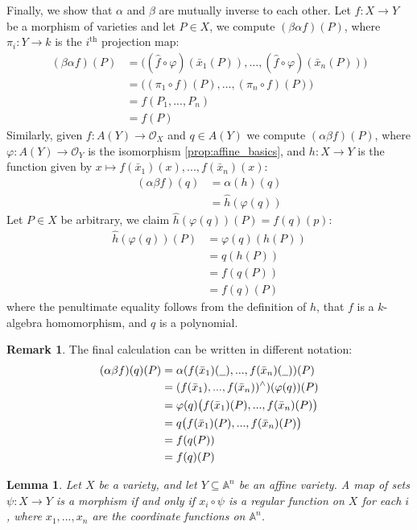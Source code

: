 \documentclass[12pt]{article}
\theoremstyle{plain}
\newtheorem{lemma}[thm]{Lemma}
\theoremstyle{definition}
\newtheorem{remark}[thm]{Remark}
\newcommand{\bb}[1]{\mathbb{#1}}
\newcommand{\call}[1]{\mathcal{#1}}
\newcommand{\und}[1]{\underline{\hspace{#1 cm}}}
\newcommand{\lto}{\longrightarrow}
\begin{document}
Finally, we show that $\alpha$ and $\beta$ are mutually inverse to each other. Let $f: X \lto Y$ be a morphism of varieties and let $P \in X$, we compute $(\beta \alpha f)(P)$, where $\pi_i: Y \lto k$ is the $i^{\text{th}}$ projection map:
\begin{align*}
    (\beta \alpha f)(P) &= \big((\hat{f} \circ \varphi)(\bar{x}_1(P)),\hdots,(\hat{f}\circ \varphi)(\bar{x}_n(P))\big)\\
    &= \big((\pi_1 \circ f)(P),\hdots,(\pi_n \circ f)(P)\big)\\
    &= f(P_1,...,P_n)\\
    &= f(P)
\end{align*}
Similarly, given $f: A(Y) \lto \call{O}_X$ and $q \in A(Y)$ we compute $(\alpha \beta f)(P)$, where $\varphi: A(Y) \lto \call{O}_Y$ is the isomorphism \eqref{prop:affine_basics}, and $h: X \lto Y$ is the function given by $x \mapsto f(\bar{x}_1)(x),...,f(\bar{x}_n)(x)$:
\begin{align*}
    (\alpha \beta f)(q) &= \alpha(h)(q)\\
    &= \hat{h}(\varphi(q))
\end{align*}
Let $P \in X$ be arbitrary, we claim $\hat{h}(\varphi(q))(P) = f(q)(p)$:
\begin{align*}
    \hat{h}(\varphi(q))(P) &= \varphi(q)(h(P))\\
    &= q(h(P))\\
    &= f(q(P))\\
    &= f(q)(P)
\end{align*}
where the penultimate equality follows from the definition of $h$, that $f$ is a $k$-algebra homomorphism, and $q$ is a polynomial.
\begin{remark}
The final calculation can be written in different notation:
\begin{align*}
    (\alpha\beta f)(q)(P) &= \alpha(f(\bar{x}_1)(\und{0.2}),...,f(\bar{x}_n)(\und{0.2}))(P)\\
    &= (f(\bar{x}_1),...,f(\bar{x}_n))^{\wedge{ }})(\varphi(q))(P)\\
    &= \varphi(q)\big(f(\bar{x}_1)(P),...,f(\bar{x}_n)(P)\big)\\
    &= q\big(f(\bar{x}_1)(P),...,f(\bar{x}_n)(P)\big)\\
    &= f(q(P))\\
    &= f(q)(P)
\end{align*}
\end{remark}
\begin{lemma}\label{lem:check_variables}
Let $X$ be a variety, and let $Y \subseteq \bb{A}^n$ be an affine variety. A map of sets $\psi: X \lto Y$ is a morphism if and only if $x_i \circ \psi$ is a regular function on $X$ for each $i$, where $x_1,...,x_n$ are the coordinate functions on $\bb{A}^n$.
\end{lemma}
\end{document}
